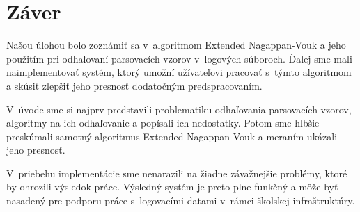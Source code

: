 \chapter*{Záver}
Našou úlohou bolo zoznámiť sa v~algoritmom Extended Nagappan-Vouk a jeho použitím pri odhaľovaní parsovacích vzorov v~logových súboroch. Ďalej sme mali naimplementovať systém, ktorý umožní užívateľovi pracovať s~týmto algoritmom a skúsiť zlepšiť jeho presnosť dodatočným predspracovaním.
\par V~úvode sme si najprv predstavili problematiku odhaľovania parsovacích vzorov, algoritmy na ich odhaľovanie a popísali ich nedostatky. Potom sme hlbšie preskúmali samotný algoritmus Extended Nagappan-Vouk a meraním ukázali jeho presnosť. 
\par V~priebehu implementácie sme nenarazili na žiadne závažnejšie problémy, ktoré by ohrozili výsledok práce. Výsledný systém je preto plne funkčný a môže byť nasadený pre podporu práce s~logovacími datami v~rámci školskej infraštruktúry.
